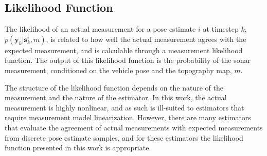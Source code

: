 %

\subsection{Likelihood Function}
\label{framework.Measurement.Weighting}

The likelihood of an actual measurement for a pose estimate $i$ at timestep $k$, $p(\mathbf{y}_k | \mathbf{s}_k^{i}, m)$, is related to how well the actual measurement agrees with the expected measurement, and is calculable through a measurement likelihood function.
The output of this likelihood function is the probability of the sonar measurement, conditioned on the vehicle pose and the topography map, $m$.

The structure of the likelihood function depends on the nature of the measurement and the nature of the estimator.
In this work, the actual measurement is highly nonlinear, and as such is ill-suited to estimators that require measurement model linearization.
However, there are many estimators that evaluate the agreement of actual measurements with expected measurements from discrete pose estimate samples, and for these estimators the likelihood function presented in this work is appropriate.

